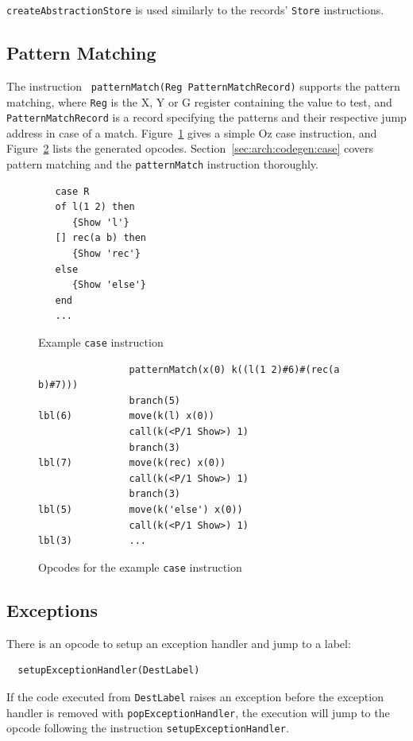 \documentclass[a4paper]{memoir}
\begin{document}
\lstinline!createAbstractionStore! is used similarly to the records'
\lstinline!Store! instructions.

\subsection{Pattern Matching}
The instruction \lstinline! patternMatch(Reg PatternMatchRecord)! supports the pattern matching,
where \lstinline!Reg! is the X, Y or G register containing the value to test, and
\lstinline!PatternMatchRecord! is a record specifying the patterns and their
respective jump address in case of a match.
Figure~\ref{fig:target:ozcase} gives a simple Oz case instruction, and Figure~\ref{fig:target:case} lists the generated opcodes.
Section~\ref{sec:arch:codegen:case} covers pattern matching and the \lstinline!patternMatch! instruction thoroughly.
 
\begin{figure}[ht]
\begin{lstlisting}
   case R
   of l(1 2) then
      {Show 'l'}
   [] rec(a b) then
      {Show 'rec'}
   else
      {Show 'else'}
   end
   ...
\end{lstlisting}
\caption{Example \lstinline!case! instruction}
\label{fig:target:ozcase}
\end{figure}

\begin{figure}[ht]
\begin{lstlisting}
                patternMatch(x(0) k((l(1 2)#6)#(rec(a b)#7)))
                branch(5)
lbl(6)          move(k(l) x(0))
                call(k(<P/1 Show>) 1)
                branch(3)
lbl(7)          move(k(rec) x(0))
                call(k(<P/1 Show>) 1)
                branch(3)
lbl(5)          move(k('else') x(0))
                call(k(<P/1 Show>) 1)
lbl(3)          ...
\end{lstlisting}
\caption{Opcodes for the example \lstinline!case! instruction}
\label{fig:target:case}
\end{figure}




\subsection{Exceptions}
There is an opcode to setup an exception handler and jump to a label:
\begin{lstlisting}
  setupExceptionHandler(DestLabel)
\end{lstlisting}
If the code executed from \lstinline!DestLabel! raises an exception before  the exception handler
is removed with \lstinline!popExceptionHandler!, the execution will jump to the
opcode following the instruction \lstinline!setupExceptionHandler!.
\end{document}
